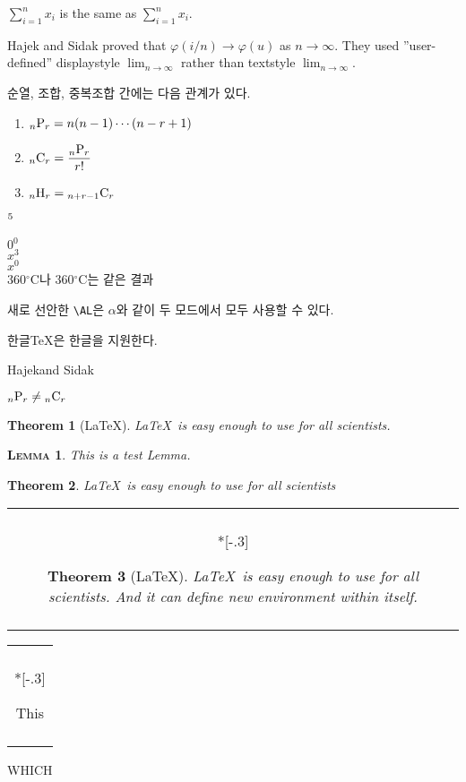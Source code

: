 \documentclass[11pt]{article}
\makeatletter
\newcommand{\dsum}[2]{\displaystyle \sum_{#1}^{#2}}
\newcommand{\vphi}{\varphi}
\newcommand{\go}{\longrightarrow}
\newcommand{\Hajek}{Hajek}
\newcommand{\Sidak}{Sidak}
\newcommand{\dlim}[1]{{\displaystyle \lim_{#1}}}
\newcommand{\harcombi}[2]{{}_{#1}{\rm H}_{#2}}
\newcommand{\permut}[2]{{}_{#1}{\rm P}_{#2}}
\newcommand{\combi}[2]{{}_{#1}{\rm C}_{#2}}
\newcommand{\tmp}[1][0]{$\mathrm{R}^{#1}$}
\renewcommand{\tmp}[2][0]{$#2^#1$}
\providecommand{\mdegree}[1]{#1\ensuremath{^\circ}}
\newcommand{\AL}{\ensuremath{\alpha}}
\newcommand{\htex}{\mbox{한글\TeX}}
\newcommand{\HandS}{\Hajek and \Sidak}
\newcommand{\pandc}[2]{\permut{#1}{#2} \ne \combi{#1}{#2}}
\newtheorem{theorem}{Theorem}[section]
\newtheorem{la}{\scshape Lemma}[section]
\newenvironment{mytheorem}{\begin{theorem} \normalfont}{\end{theorem}}
\newenvironment{myfbox}[1][\textwidth]%
{\begin{tabular}{|@{\hspace{1em}}c@{\hspace{1em}}|}%
\hline \\*[-.3\baselineskip]
\begin{minipage}[t]{#1}}%
{\end{minipage} \\ \vspace{-.3\baselineskip} \\
\hline \end{tabular}}
\makeatother
\begin{document}
$\dsum{i=1}{n} x_i$ is the same as $\sum_{i=1}^n x_i$.

Hajek and Sidak proved that $\vphi (i/n)\go \vphi(u)$ as $n\go\infty$. They used  ''user-defined'' displaystyle $\dlim{n\go\infty}$ rather than textstyle $\lim_{n\go\infty}$.

순열, 조합, 중복조합 간에는 다음 관계가 있다.
\begin{enumerate}
\item $\permut{n}{r}=n(n-1)\cdots(n-r+1)$
\item $\combi{n}{r}={\displaystyle \frac{\permut{n}{r}}{r!}}$
\item $\harcombi{n}{r}=\combi{n+r-1}{r}$
\end{enumerate}

\tmp[5] \\

\tmp{0} \\

\tmp[3]{x} \\

\tmp{x}  \\

\mdegree{360}C나 $\mdegree{360}$C는 같은 결과

새로 선안한 \verb+\AL+은  $\AL$와 같이 두 모드에서 모두 사용할 수 있다.

\htex 은 한글을 지원한다.

\HandS

$\pandc{n}{r}$

\begin{theorem}[\LaTeX] \label{th:texusage}
\LaTeX\ is easy enough to use for all scientists.
\end{theorem}

\begin{la}
This is a test Lemma.
\end{la}

\begin{mytheorem}[\LaTeX]
\LaTeX\ is easy enough to use for all scientists
\end{mytheorem}

\begin{myfbox}%
\vspace*{-1.5\baselineskip}
\begin{theorem}[\LaTeX] \label{th:texsage2}
\LaTeX\ is easy enough to use for all scientists. And it can define new environment within itself.
\end{theorem}
\vspace*{-1.5\baselineskip}
\end{myfbox}

\begin{myfbox}{.36\textwidth}
This 
\end{myfbox} WHICH
\end{document}
